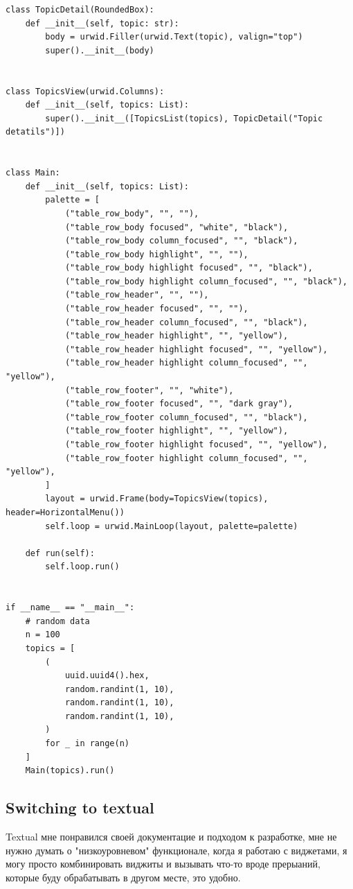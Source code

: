 \documentclass[10pt , a4paper]{report}
\newenvironment{code}{\captionsetup{type=listing}}{}
\begin{document}
\begin{code}
\begin{verbatim}
class TopicDetail(RoundedBox):
    def __init__(self, topic: str):
        body = urwid.Filler(urwid.Text(topic), valign="top")
        super().__init__(body)


class TopicsView(urwid.Columns):
    def __init__(self, topics: List):
        super().__init__([TopicsList(topics), TopicDetail("Topic detatils")])


class Main:
    def __init__(self, topics: List):
        palette = [
            ("table_row_body", "", ""),
            ("table_row_body focused", "white", "black"),
            ("table_row_body column_focused", "", "black"),
            ("table_row_body highlight", "", ""),
            ("table_row_body highlight focused", "", "black"),
            ("table_row_body highlight column_focused", "", "black"),
            ("table_row_header", "", ""),
            ("table_row_header focused", "", ""),
            ("table_row_header column_focused", "", "black"),
            ("table_row_header highlight", "", "yellow"),
            ("table_row_header highlight focused", "", "yellow"),
            ("table_row_header highlight column_focused", "", "yellow"),
            ("table_row_footer", "", "white"),
            ("table_row_footer focused", "", "dark gray"),
            ("table_row_footer column_focused", "", "black"),
            ("table_row_footer highlight", "", "yellow"),
            ("table_row_footer highlight focused", "", "yellow"),
            ("table_row_footer highlight column_focused", "", "yellow"),
        ]
        layout = urwid.Frame(body=TopicsView(topics), header=HorizontalMenu())
        self.loop = urwid.MainLoop(layout, palette=palette)

    def run(self):
        self.loop.run()


if __name__ == "__main__":
    # random data
    n = 100
    topics = [
        (
            uuid.uuid4().hex,
            random.randint(1, 10),
            random.randint(1, 10),
            random.randint(1, 10),
        )
        for _ in range(n)
    ]
    Main(topics).run()
  \end{verbatim}
\end{code}

\subsection{Switching to textual}

Textual мне понравился своей документацие и подходом к разработке, мне не нужно думать о "низкоуровневом" функционале, когда я работаю с виджетами, я могу просто комбинировать виджиты и вызывать что-то вроде прерыаний, которые буду обрабатывать в другом месте, это удобно.
\end{document}
